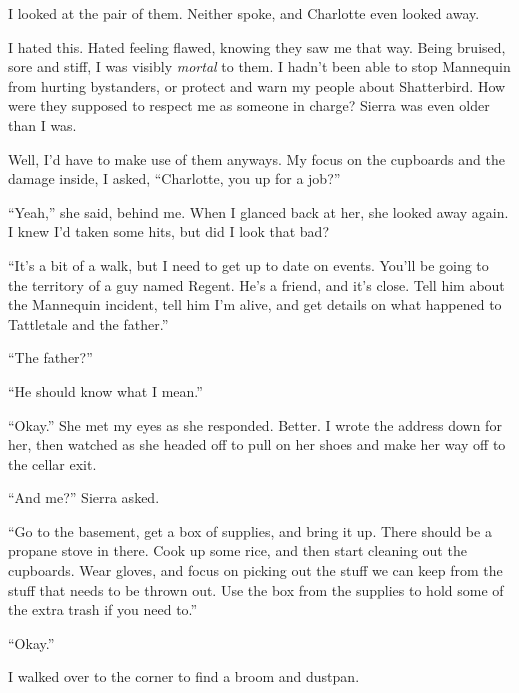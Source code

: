 I looked at the pair of them.  Neither spoke, and Charlotte even looked away.



I hated this.  Hated feeling flawed, knowing they saw me that way.  Being bruised, sore and stiff, I was visibly \emph{mortal }to them.  I hadn't been able to stop Mannequin from hurting bystanders, or protect and warn my people about Shatterbird.  How were they supposed to respect me as someone in charge?  Sierra was even older than I was.



Well, I'd have to make use of them anyways.  My focus on the cupboards and the damage inside, I asked, ``Charlotte, you up for a job?''



``Yeah,'' she said, behind me.  When I glanced back at her, she looked away again.  I knew I'd taken some hits, but did I look that bad?



``It's a bit of a walk, but I need to get up to date on events.  You'll be going to the territory of a guy named Regent.  He's a friend, and it's close.  Tell him about the Mannequin incident, tell him I'm alive, and get details on what happened to Tattletale and the father.''



``The father?''



``He should know what I mean.''



``Okay.''  She met my eyes as she responded.  Better.   I wrote the address down for her, then watched as she headed off to pull on her shoes and make her way off to the cellar exit.



``And me?'' Sierra asked.



``Go to the basement, get a box of supplies, and bring it up.  There should be a propane stove in there.  Cook up some rice, and then start cleaning out the cupboards.  Wear gloves, and focus on picking out the stuff we can keep from the stuff that needs to be thrown out.  Use the box from the supplies to hold some of the extra trash if you need to.''



``Okay.''



I walked over to the corner to find a broom and dustpan.



